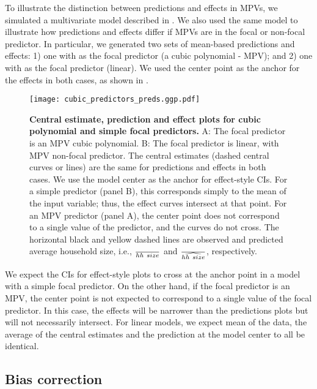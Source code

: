 To illustrate the distinction between predictions and effects in MPVs, we simulated a multivariate model described in . We also used the same model to illustrate how predictions and effects differ if MPVs are in the focal or non-focal predictor. In particular, we generated two sets of mean-based predictions and effects: 1) one with  as the focal predictor (a cubic polynomial - MPV); and 2) one with  as the focal predictor (linear). We used the center point as the anchor for the effects in both cases, as shown in .
%
\begin{figure}
\begin{center}
\texttt{[image: cubic\_predictors\_preds.ggp.pdf]}
\end{center}
\caption{{\bf Central estimate, prediction and effect plots for cubic polynomial and simple focal predictors.} A: The focal predictor is an MPV cubic polynomial. B: The focal predictor is linear, with MPV non-focal predictor. The central estimates (dashed central curves or lines) are the same for predictions and effects in both cases. We use the model center as the anchor for effect-style CIs. For a simple predictor (panel B), this corresponds simply to the mean of the input variable; thus, the effect curves intersect at that point. For an MPV predictor (panel A), the center point does not correspond to a single value of the predictor, and the curves do not cross. The horizontal black and yellow dashed lines are observed and predicted average household size, i.e., $\over{hh~size}$ and $\over{\widehat{hh~size}}$, respectively.}
\label{fig:pred_cubic_plots}
\end{figure}
%
We expect the CIs for effect-style plots to cross at the anchor point in a model with a simple focal predictor. On the other hand, if the focal predictor is an MPV, the center point is not expected to correspond to a single value of the focal predictor. In this case, the effects will be narrower than the predictions plots but will not necessarily intersect. 
For linear models, we expect mean of the data, the average of the central estimates and the prediction at the model center to all be identical. 

\subsection{Bias correction}

